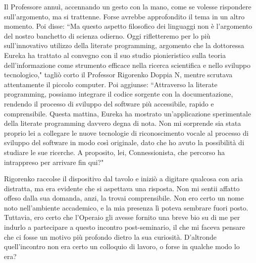 \documentclass[12pt,b5paper]{article}
\begin{document}
Il Professore annuì, accennando un gesto con la mano, come se volesse rispondere
sull'argomento, ma si trattenne. Forse avrebbe approfondito il tema in un altro momento. 
Poi disse: ``Ma questo aspetto filosofico dei linguaggi non è l'argomento del nostro banchetto
di scienza odierno. Oggi rifletteremo per lo più sull'innovativo utilizzo della
literate programming, argomento che la dottoressa Eureka ha trattato al
convegno con il suo studio pionieristico sulla teoria dell'informazione come
strumento efficace nella ricerca scientifica e nello sviluppo tecnologico,"
tagliò corto il Professor Rigorenko Doppia N, mentre scrutava attentamente il
piccolo computer. Poi aggiunse: ``Attraverso la literate programming, possiamo integrare
il codice sorgente con la documentazione, rendendo il processo di sviluppo del
software più accessibile, rapido e comprensibile. Questa mattina, Eureka ha
mostrato un'applicazione sperimentale della literate programming davvero degna
di nota. Non mi sorprende sia stata proprio lei a collegare le nuove tecnologie
di riconoscimento vocale al processo di sviluppo del software in modo così
originale, dato che ho avuto la possibilità di studiare le sue ricerche. A
proposito, lei, Connessionista, che percorso ha intrappreso per arrivare fin qui?" 

Rigorenko raccolse il dispositivo dal tavolo e iniziò a digitare qualcosa con aria
distratta, ma era evidente che si aspettava una risposta. Non mi sentii affatto
offeso dalla sua domanda, anzi, la trovai comprensibile. Non ero certo un nome
noto nell'ambiente accademico, e la mia presenza lì poteva sembrare fuori
posto. Tuttavia, ero certo che l'Operaio gli avesse fornito una breve bio su di
me per indurlo a partecipare a questo incontro post-seminario, il che mi faceva
pensare che ci fosse un motivo più profondo dietro la sua curiosità. 
D'altronde quell'incontro non era certo un colloquio di lavoro, o forse in 
qualche modo lo era? 
\end{document}
